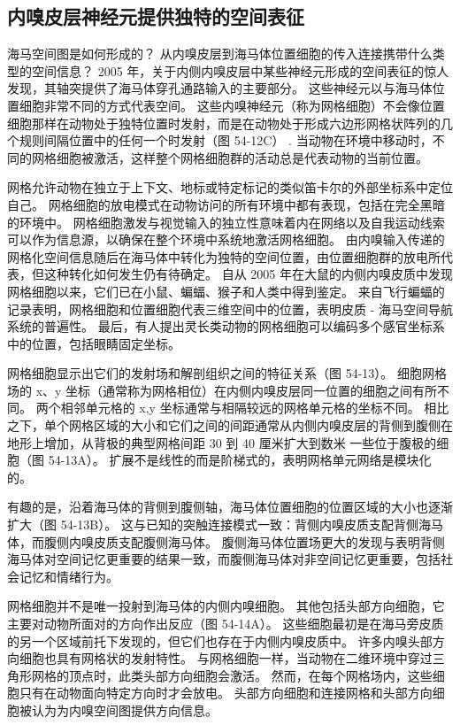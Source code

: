 \subsection{内嗅皮层神经元提供独特的空间表征}
海马空间图是如何形成的？ 从内嗅皮层到海马体位置细胞的传入连接携带什么类型的空间信息？ 2005 年，关于内侧内嗅皮层中某些神经元形成的空间表征的惊人发现，其轴突提供了海马体穿孔通路输入的主要部分。 这些神经元以与海马体位置细胞非常不同的方式代表空间。 这些内嗅神经元（称为网格细胞）不会像位置细胞那样在动物处于独特位置时发射，而是在动物处于形成六边形网格状阵列的几个规则间隔位置中的任何一个时发射（图 54-12C） . 当动物在环境中移动时，不同的网格细胞被激活，这样整个网格细胞群的活动总是代表动物的当前位置。

网格允许动物在独立于上下文、地标或特定标记的类似笛卡尔的外部坐标系中定位自己。 网格细胞的放电模式在动物访问的所有环境中都有表现，包括在完全黑暗的环境中。 网格细胞激发与视觉输入的独立性意味着内在网络以及自我运动线索可以作为信息源，以确保在整个环境中系统地激活网格细胞。 由内嗅输入传递的网格化空间信息随后在海马体中转化为独特的空间位置，由位置细胞群的放电所代表，但这种转化如何发生仍有待确定。 自从 2005 年在大鼠的内侧内嗅皮质中发现网格细胞以来，它们已在小鼠、蝙蝠、猴子和人类中得到鉴定。 来自飞行蝙蝠的记录表明，网格细胞和位置细胞代表三维空间中的位置，表明皮质 - 海马空间导航系统的普遍性。 最后，有人提出灵长类动物的网格细胞可以编码多个感官坐标系中的位置，包括眼睛固定坐标。

网格细胞显示出它们的发射场和解剖组织之间的特征关系（图 54-13）。 细胞网格场的 x、y 坐标（通常称为网格相位）在内侧内嗅皮层同一位置的细胞之间有所不同。 两个相邻单元格的 x,y 坐标通常与相隔较远的网格单元格的坐标不同。 相比之下，单个网格区域的大小和它们之间的间距通常从内侧内嗅皮层的背侧到腹侧在地形上增加，从背极的典型网格间距 30 到 40 厘米扩大到数米 一些位于腹极的细胞（图 54-13A）。 扩展不是线性的而是阶梯式的，表明网格单元网络是模块化的。

有趣的是，沿着海马体的背侧到腹侧轴，海马体位置细胞的位置区域的大小也逐渐扩大（图 54-13B）。 这与已知的突触连接模式一致：背侧内嗅皮质支配背侧海马体，而腹侧内嗅皮质支配腹侧海马体。 腹侧海马体位置场更大的发现与表明背侧海马体对空间记忆更重要的结果一致，而腹侧海马体对非空间记忆更重要，包括社会记忆和情绪行为。

网格细胞并不是唯一投射到海马体的内侧内嗅细胞。 其他包括头部方向细胞，它主要对动物所面对的方向作出反应（图 54-14A）。 这些细胞最初是在海马旁皮质的另一个区域前托下发现的，但它们也存在于内侧内嗅皮质中。 许多内嗅头部方向细胞也具有网格状的发射特性。 与网格细胞一样，当动物在二维环境中穿过三角形网格的顶点时，此类头部方向细胞会激活。 然而，在每个网格场内，这些细胞只有在动物面向特定方向时才会放电。 头部方向细胞和连接网格和头部方向细胞被认为为内嗅空间图提供方向信息。


